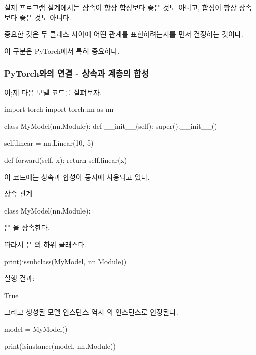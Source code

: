 실제 프로그램 설계에서는 상속이 항상 합성보다 좋은 것도 아니고, 합성이 항상 상속보다 좋은 것도 아니다.

중요한 것은 두 클래스 사이에 어떤 관계를 표현하려는지를 먼저 결정하는 것이다.

이 구분은 PyTorch에서 특히 중요하다.

\subsubsection{PyTorch와의 연결 -  상속과 계층의 합성}

이;제 다음 모델 코드를 살펴보자.

\begin{dhkcode}
import torch
import torch.nn as nn


class MyModel(nn.Module):
    def __init__(self):
        super().__init__()

        self.linear = nn.Linear(10, 5)

    def forward(self, x):
        return self.linear(x)
\end{dhkcode}

이 코드에는 상속과 합성이 동시에 사용되고 있다.

\begin{dhknote}
\begin{dhksmry}[centered]
상속 관계
\end{dhksmry}
\end{dhknote}

\begin{dhkcode}
class MyModel(nn.Module):
\end{dhkcode}

은 을 상속한다.

따라서 은 의 하위 클래스다.

\begin{dhkcode}
print(issubclass(MyModel, nn.Module))
\end{dhkcode}

실행 결과:

\begin{dhkzsh}
True
\end{dhkzsh}

그리고 생성된 모델 인스턴스 역시 의 인스턴스로 인정된다.

\begin{dhkcode}
model = MyModel()

print(isinstance(model, nn.Module))
\end{dhkcode}

